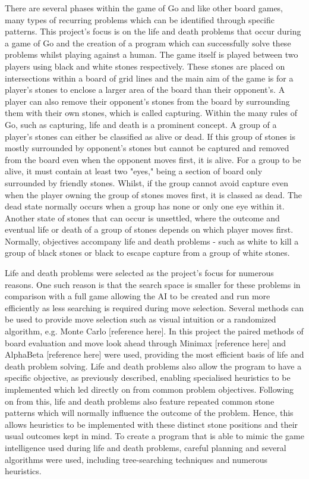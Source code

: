 \documentclass{l3proj}
\begin{document}
There are several phases within the game of Go and like other board games, many types of recurring problems which can be identified through specific patterns. This project's focus is on the life and death problems that occur during a game of Go and the creation of a program which can successfully solve these problems whilst playing against a human. The game itself is played between two players using black and white stones respectively. These stones are placed on intersections within a board of grid lines and the main aim of the game is for a player's stones to enclose a larger area of the board than their opponent's. A player can also remove their opponent's stones from the board by surrounding them with their own stones, which is called capturing. Within the many rules of Go, such as capturing, life and death is a prominent concept. A group of a player's stones can either be classified as alive or dead. If this group of stones is mostly surrounded by opponent's stones but cannot be captured and removed from the board even when the opponent moves first, it is alive. For a group to be alive, it must contain at least two "eyes," being a section of board only surrounded by friendly stones. Whilst, if the group cannot avoid capture even when the player owning the group of stones moves first, it is classed as dead. The dead state normally occurs when a group has none or only one eye within it. Another state of stones that can occur is unsettled, where the outcome and eventual life or death of a group of stones depends on which player moves first. Normally, objectives accompany life and death problems - such as white to kill a group of black stones or black to escape capture from a group of white stones.

Life and death problems were selected as the project's focus for numerous reasons. One such reason is that the search space is smaller for these problems in comparison with a full game allowing the AI to be created and run more efficiently as less searching is required during move selection. Several methods can be used to provide move selection such as visual intuition or a randomized algorithm, e.g. Monte Carlo [reference here]. In this project the paired methods of board evaluation and move look ahead through Minimax [reference here] and AlphaBeta [reference here] were used, providing the most efficient basis of life and death problem solving. Life and death problems also allow the program to have a specific objective, as previously described, enabling specialised heuristics to be implemented which led directly on from common problem objectives. Following on from this, life and death problems also feature repeated common stone patterns which will normally influence the outcome of the problem. Hence, this allows heuristics to be implemented with these distinct stone positions and their usual outcomes kept in mind. To create a program that is able to mimic the game intelligence used during life and death problems, careful planning and several algorithms were used, including tree-searching techniques and numerous heuristics.
\end{document}
